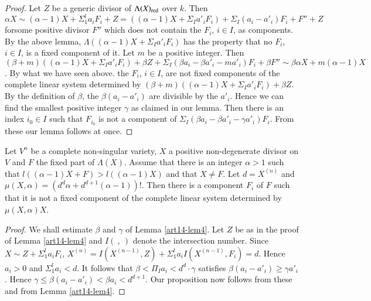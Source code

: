 \begin{proof}
Let $Z$ be a generic divisor of $\Lambda(X)_{\operatorname{\mathrm{red}}}$ over $k$. Then $\alpha X\sim (\alpha-1)X+\Sigma^{l}_{1}a_{i}F_{i}+Z=((\alpha-1)X+\Sigma_{I}a'_{i}F_{i})+\Sigma_{I}(a_{i}-a'_{i})F_{i}+F''+Z$ for\pageoriginale some positive divisor $F''$ which does not contain the $F_{i}$, $i\in I$, as components. By the above lemma, $\Lambda((\alpha-1)X+\Sigma_{I}a'_{i}F_{i})$ has the property that no $F_{i}$, $i\in I$, is a fixed component of it. Let $m$ be a positive integer. Then $(\beta+m)((\alpha-1)X+\Sigma_{I}a'_{i}F_{i})+\beta Z+\Sigma_{I}(\beta a_{i}-\beta a'_{i}-ma'_{i})F_{i}+\beta F''\sim \beta\alpha X+m(\alpha-1)X$. By what we have seen above. the $F_{i}$, $i\in I$, are not fixed components of the complete linear system determined by $(\beta+m)((\alpha-1)X+\Sigma_{I}a'_{i}F_{i})+\beta Z$. By the definition of $\beta$, the $\beta(a_{i}-a'_{i})$ are divisible by the $a'_{i}$. Hence we can find the smallest positive integer $\gamma$ as claimed in our lemma. Then there is an index $i_{0}\in I$ such that $F_{i_{0}}$ is not a component of $\Sigma_{I}(\beta a_{i}-\beta a'_{i}-\gamma a'_{i})F_{i}$. From these our lemma follows at once.
\end{proof}

\begin{proposition}\label{art14-prop4}
Let $V^{n}$ be a complete non-singular variety, $X$ a positive non-degenerate divisor on $V$ and $F$ the fixed part of $\Lambda(X)$. Assume that there is an integer $\alpha >1$ such that $l((\alpha-1)X+F)>l((\alpha-1)X)$ and that $X\neq F$. Let $d=X^{(n)}$ and $\mu(X,\alpha)=(d^{d}\alpha+d^{d+1}(\alpha-1))!$. Then there is a component $F_{i}$ of $F$ such that it is not a fixed component of the complete linear system determined by $\mu(X,\alpha)X$.
\end{proposition}

\begin{proof}
We shall estimate $\beta$ and $\gamma$ of Lemma \ref{art14-lem4}. Let $Z$ be as in the proof of Lemma \ref{art14-lem4} and $I(~ ,~ )$ denote the intersection number. Since $X\sim Z+\Sigma^{l}_{1}a_{i}F_{i}$, $X^{(n)}=I(X^{(n-1)},Z)+\Sigma^{l}_{1}a_{i}I(X^{(n-1)},F_{i})=d$. Hence $a_{i}>0$ and $\Sigma^{l}_{1}a_{i}<d$. It follows that $\beta<\Pi_{I}a_{i}<d^{d}\cdot \gamma$ satisfies $\beta(a_{i}-a'_{i})\geq \gamma a'_{i}$. Hence $\gamma\leq \beta(a_{i}-a'_{i})<\beta a_{i}<d^{d+1}$. Our proposition now follows from these and from Lemma \ref{art14-lem4}.
\end{proof}

